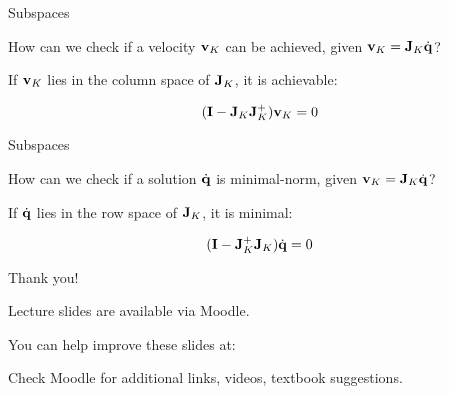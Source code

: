 \documentclass{beamer}
\begin{document}
\begin{frame}{Subspaces}
	\begin{flushleft}
		
		How can we check if a velocity $\mathbf{v}_K$ can be achieved, given $\mathbf{v}_K = \mathbf{J}_K \dot{\mathbf{q}}$?
		
		\bigskip
		
		If $\mathbf{v}_K$ lies in the column space of $\mathbf{J}_K$, it is achievable:
		
		\begin{equation}
			(\mathbf{I} - \mathbf{J}_K\mathbf{J}_K^+) \mathbf{v}_K = 0
		\end{equation}	
	
	
		
	\end{flushleft}
\end{frame}



\begin{frame}{Subspaces}
	\begin{flushleft}
		
		How can we check if a solution $\dot{\mathbf{q}}$ is minimal-norm, given $\mathbf{v}_K = \mathbf{J}_K \dot{\mathbf{q}}$?
		
		\bigskip
		
		If $\dot{\mathbf{q}}$ lies in the row space of $\mathbf{J}_K$, it is minimal:
		
		\begin{equation}
			(\mathbf{I} - \mathbf{J}_K^+\mathbf{J}_K) \dot{\mathbf{q}} = 0
		\end{equation}	
		
		
		
	\end{flushleft}
\end{frame}




\begin{frame}{Thank you!}
\centerline{Lecture slides are available via Moodle.}
\bigskip
\centerline{You can help improve these slides at:}
\centerline{\mygit}
\bigskip
\centerline{Check Moodle for additional links, videos, textbook suggestions.}
\bigskip

\centerline{\textcolor{black}{}}

\end{frame}
\end{document}

